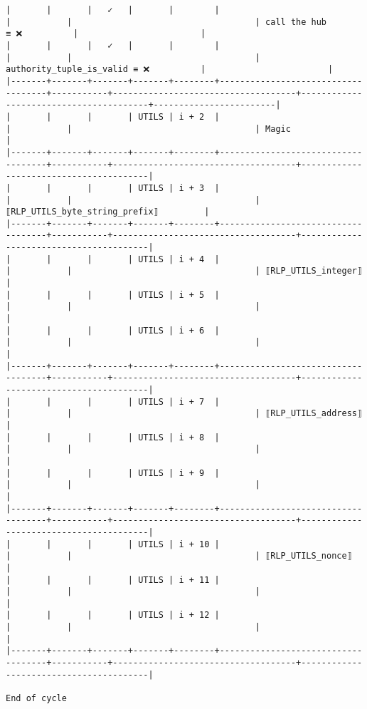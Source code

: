 \documentclass[varwidth=\maxdimen,margin=0.5cm,multi={verbatim}]{standalone}
\begin{document}
\begin{verbatim}
|       |       |   ✓   |       |        |                                    |           |                                    | call the hub             ≡ ❌          |                        |
|       |       |   ✓   |       |        |                                    |           |                                    | authority_tuple_is_valid ≡ ❌          |                        |
|-------+-------+-------+-------+--------+------------------------------------+-----------+------------------------------------+----------------------------------------+------------------------|
|       |       |       | UTILS | i + 2  |                                    |           |                                    | Magic                                  |
|-------+-------+-------+-------+--------+------------------------------------+-----------+------------------------------------+----------------------------------------|
|       |       |       | UTILS | i + 3  |                                    |           |                                    | ⟦RLP_UTILS_byte_string_prefix⟧         |
|-------+-------+-------+-------+--------+------------------------------------+-----------+------------------------------------+----------------------------------------|
|       |       |       | UTILS | i + 4  |                                    |           |                                    | ⟦RLP_UTILS_integer⟧                    |
|       |       |       | UTILS | i + 5  |                                    |           |                                    |                                        |
|       |       |       | UTILS | i + 6  |                                    |           |                                    |                                        |
|-------+-------+-------+-------+--------+------------------------------------+-----------+------------------------------------+----------------------------------------|
|       |       |       | UTILS | i + 7  |                                    |           |                                    | ⟦RLP_UTILS_address⟧                    |
|       |       |       | UTILS | i + 8  |                                    |           |                                    |                                        |
|       |       |       | UTILS | i + 9  |                                    |           |                                    |                                        |
|-------+-------+-------+-------+--------+------------------------------------+-----------+------------------------------------+----------------------------------------|
|       |       |       | UTILS | i + 10 |                                    |           |                                    | ⟦RLP_UTILS_nonce⟧                      |
|       |       |       | UTILS | i + 11 |                                    |           |                                    |                                        |
|       |       |       | UTILS | i + 12 |                                    |           |                                    |                                        |
|-------+-------+-------+-------+--------+------------------------------------+-----------+------------------------------------+----------------------------------------|

End of cycle

\end{verbatim}
\end{document}
